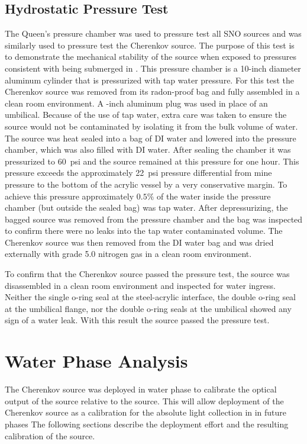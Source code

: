 \subsection{Hydrostatic Pressure Test}

The Queen's pressure chamber was used to pressure test all SNO sources and was similarly used to pressure test the Cherenkov source. 
The purpose of this test is to demonstrate the mechanical stability of the source when exposed to pressures consistent with being submerged in {\snop}.
This pressure chamber is a 10-inch diameter aluminum cylinder that is pressurized with tap water pressure. For this test the Cherenkov source was removed from its radon-proof bag and fully assembled in a clean room environment. A -inch aluminum plug was used in place of an umbilical. Because of the use of tap water, extra care was taken to ensure the source would not be contaminated by isolating it from the bulk volume of water. The source was heat sealed into a bag of DI water and lowered into the pressure chamber, which was also filled with DI water. After sealing the chamber it was pressurized to 60~psi and the source remained at this pressure for one hour. This pressure exceeds the approximately 22~psi pressure differential from mine pressure to the bottom of the acrylic vessel by a very conservative margin. To achieve this pressure approximately $0.5\%$ of the water inside the pressure chamber (but outside the sealed bag) was tap water. After depressurizing, the bagged source was removed from the pressure chamber and the bag was inspected to confirm there were no leaks into the tap water contaminated volume. The Cherenkov source was then removed from the DI water bag and was dried externally with grade 5.0 nitrogen gas in a clean room environment. 

To confirm that the Cherenkov source passed the pressure test, the source was disassembled in a clean room environment and inspected for water ingress. Neither the single o-ring seal at the steel-acrylic interface, the double o-ring seal at the umbilical flange, nor the double o-ring seals at the umbilical showed any sign of a water leak. With this result the source passed the pressure test.

\section{Water Phase Analysis}
\label{chap:water_phase}
The Cherenkov source was deployed in {\snop} water phase to calibrate the optical output of the source relative to the \N source.
This will allow deployment of the Cherenkov source as a calibration for the absolute light collection in {\snop} in future phases
The following sections describe the deployment effort and the resulting calibration of the source.

